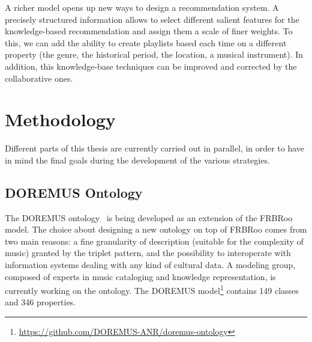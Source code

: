 \documentclass{llncs}
\begin{document}
A richer model opens up new ways to design a recommendation system. A precisely structured information allows to select different salient features for the knowledge-based recommendation and assign them a scale of finer weights. To this, we can add the ability to create playlists based each time on a different property (the genre, the historical period, the location, a musical instrument). In addition, this knowledge-base techniques can be improved and corrected by the collaborative ones.


\section{Methodology}
\label{sec:methodology}
Different parts of this thesis are currently carried out in parallel, in order to have in mind the final goals during the development of the various strategies.

\subsection{DOREMUS Ontology}
The DOREMUS ontology~\cite{choffe2016doremus} is being developed as an extension of the FRBRoo model. The choice about designing a new ontology on top of FRBRoo comes from two main reasons: a fine granularity of description (suitable for the complexity of music) granted by the triplet pattern, and the possibility to interoperate with information systems dealing with any kind of cultural data. A modeling group, composed of experts in music cataloging and knowledge representation, is currently working on the ontology. The DOREMUS model\footnote{\url{https://github.com/DOREMUS-ANR/doremus-ontology}} contains 149 classes and 346 properties.
\end{document}
